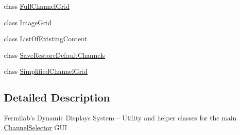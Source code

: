 \begin{DoxyCompactItemize}
\item 
class \hyperlink{classgov_1_1fnal_1_1ppd_1_1dd_1_1changer_1_1FullChannelGrid}{Full\-Channel\-Grid}
\item 
class \hyperlink{classgov_1_1fnal_1_1ppd_1_1dd_1_1changer_1_1ImageGrid}{Image\-Grid}
\item 
class \hyperlink{classgov_1_1fnal_1_1ppd_1_1dd_1_1changer_1_1ListOfExistingContent}{List\-Of\-Existing\-Content}
\item 
class \hyperlink{classgov_1_1fnal_1_1ppd_1_1dd_1_1changer_1_1SaveRestoreDefaultChannels}{Save\-Restore\-Default\-Channels}
\item 
class \hyperlink{classgov_1_1fnal_1_1ppd_1_1dd_1_1changer_1_1SimplifiedChannelGrid}{Simplified\-Channel\-Grid}
\end{DoxyCompactItemize}


\subsection{Detailed Description}
Fermilab's Dynamic Displays System -- Utility and helper classes for the main \hyperlink{classgov_1_1fnal_1_1ppd_1_1dd_1_1ChannelSelector}{Channel\-Selector} G\-U\-I